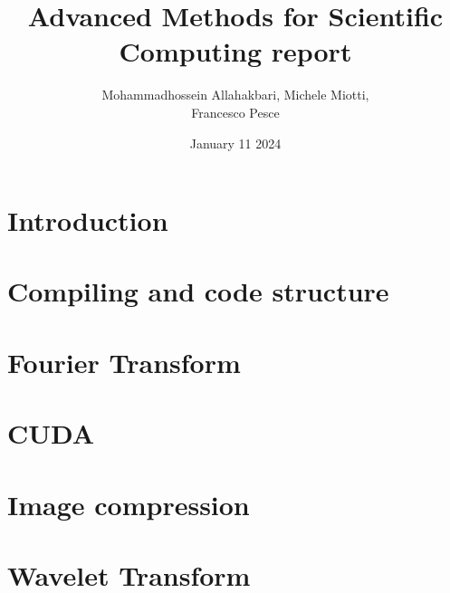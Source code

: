 \documentclass{article}
\title{Advanced Methods for Scientific Computing report}
\author{Mohammadhossein Allahakbari, Michele Miotti, \\Francesco Pesce}
\date{January 11 2024}
\begin{document}
\maketitle


\section{Introduction}
	

\section{Compiling and code structure}
	

\section{Fourier Transform}
	 

\section{CUDA}
	 

\section{Image compression}
	 

\section{Wavelet Transform}
	 




\end{document}
